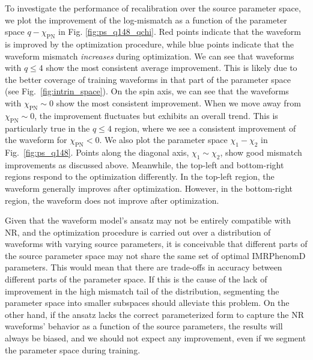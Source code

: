 \documentclass[twocolumn]{aastex631}
\begin{document}
To investigate the performance of recalibration over the source parameter space,
we plot the improvement of the log-mismatch as a function of the parameter space
$q-\chi_{\mathrm{PN}}$ in Fig. \ref{fig:ps_q148_qchi}. Red points indicate that the waveform
is improved by the optimization procedure, while blue points indicate that the waveform mismatch
\textit{increases} during optimization.
We can see that waveforms with $q\leq4$ show the most consistent average improvement.
This is likely due to the better coverage of training waveforms in that part of the parameter space (see Fig.~\ref{fig:intrin_space}).
On the spin axis, we can see that the waveforms with
$\chi_{\textrm{PN}}\sim0$ show the most consistent improvement. 
When we move away from $\chi_{\textrm{PN}}\sim0$, the improvement fluctuates but exhibits an overall trend. 
This is particularly true in the $q\leq4$ region, where we see a consistent
improvement of the waveform for $\chi_{\textrm{PN}}<0$. 
We also plot the parameter space $\chi_1 - \chi_2$ in Fig.~\ref{fig:ps_q148}. 
Points along the diagonal axis, $\chi_1\sim\chi_2$, show good mismatch improvements as discussed
above. Meanwhile, the top-left and bottom-right regions respond to the optimization differently. In the top-left
region, the waveform generally improves after optimization. However,
in the bottom-right region, the waveform does not improve after optimization. 

Given that the waveform model's ansatz may not be entirely compatible with NR,
and the optimization procedure is carried out over a distribution of waveforms
with varying source parameters, it is conceivable that different parts of the
source parameter space may not share the same set of optimal IMRPhenomD
parameters.
This would mean that there are trade-offs in accuracy between different
parts of the parameter space. If this is the cause of the lack of improvement in
the high mismatch tail of the distribution, segmenting the parameter space into
smaller subspaces should alleviate this problem. On the other hand, if the
ansatz lacks the correct parameterized form to capture the NR waveforms'
behavior as a function of the source parameters, the results will always be
biased, and we should not expect any improvement, even if we segment the
parameter space during training.
\end{document}
